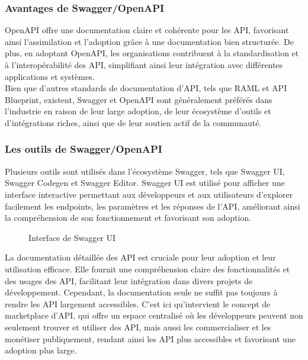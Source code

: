     \subsubsection{Avantages de Swagger/OpenAPI} 
        OpenAPI offre une documentation claire et cohérente pour les API, favorisant ainsi l'assimilation et l'adoption grâce à une documentation bien structurée. De plus, en adoptant OpenAPI, les organisations contribuent à la standardisation et à l'interopérabilité des API, simplifiant ainsi leur intégration avec différentes applications et systèmes. \\
        Bien que d'autres standards de documentation d'API, tels que RAML et API Blueprint, existent, Swagger et OpenAPI sont généralement préférés dans l'industrie en raison de leur large adoption, de leur écosystème d'outils et d'intégrations riches, ainsi que de leur soutien actif de la communauté.\cite[]{AvantageSwagger} 

    \subsubsection{Les outils de Swagger/OpenAPI }
    Plusieurs outils sont utilisés dans l'écosystème Swagger, tels que Swagger UI, Swagger Codegen et Swagger Editor. Swagger UI est utilisé pour afficher une interface interactive permettant aux développeurs et aux utilisateurs d'explorer facilement les endpoints, les paramètres et les réponses de l'API, améliorant ainsi la compréhension de son fonctionnement et favorisant son adoption.\cite[]{Swagger}
   
    \begin{figure}[H]    
        \centering
            \caption{Interface de Swagger UI }
            \label{fig:logo_tt}
        \end{figure}


       La documentation détaillée des API est cruciale pour leur adoption et leur utilisation efficace. Elle fournit une compréhension claire des fonctionnalités et des usages des API, facilitant leur intégration dans divers projets de développement. Cependant, la documentation seule ne suffit pas toujours à rendre les API largement accessibles. C'est ici qu'intervient le concept de marketplace d'API, qui offre un espace centralisé où les développeurs peuvent non seulement trouver et utiliser des API, mais aussi les commercialiser et les monétiser publiquement, rendant ainsi les API plus accessibles et favorisant une adoption plus large.


